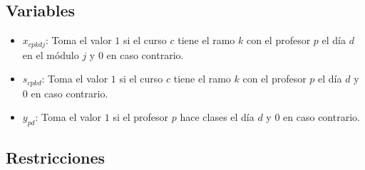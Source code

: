 \documentclass[letterpaper]{article}
\begin{document}
\subsection{Variables}
\begin{itemize}
    \item $x_{cpkdj}$: Toma el valor $1$ si el curso $c$ tiene el ramo $k$ con el profesor $p$ el día $d$ en el módulo $j$ y $0$ en caso contrario.
    \item $s_{cpkd}$: Toma el valor $1$ si el curso $c$ tiene el ramo $k$ con el profesor $p$ el día $d$ y $0$ en caso contrario.
    \item $y_{pd}$: Toma el valor $1$ si el profesor $p$ hace clases el día $d$ y $0$ en caso contrario.
\end{itemize}

\subsection{Restricciones}
\end{document}
